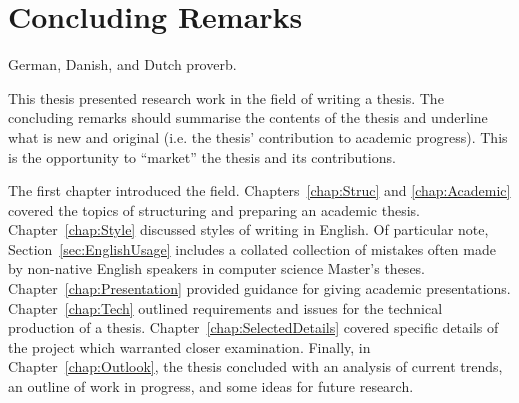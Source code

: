 %
%
% 
% 
% 


\chapter{Concluding Remarks}

\label{chap:Concl}


{
German, Danish, and Dutch proverb.
}



This thesis presented research work in the field of writing a thesis.
The concluding remarks should summarise the contents of the thesis and
underline what is new and original (i.e. the thesis' contribution to
academic progress). This is the opportunity to ``market'' the thesis
and its contributions.

The first chapter introduced the field. Chapters~\ref{chap:Struc} and
\ref{chap:Academic} covered the topics of structuring and preparing an
academic thesis.
%
Chapter~\ref{chap:Style} discussed styles of writing in English. Of
particular note, Section~\ref{sec:EnglishUsage} includes a collated
collection of mistakes often made by non-native English speakers in
computer science Master's theses. Chapter~\ref{chap:Presentation}
provided guidance for giving academic presentations.
Chapter~\ref{chap:Tech} outlined requirements and issues for the
technical production of a thesis. Chapter~\ref{chap:SelectedDetails}
covered specific details of the project which warranted closer
examination.
%
Finally, in Chapter~\ref{chap:Outlook}, the thesis concluded with an
analysis of current trends, an outline of work in progress,
and some ideas for future research.

